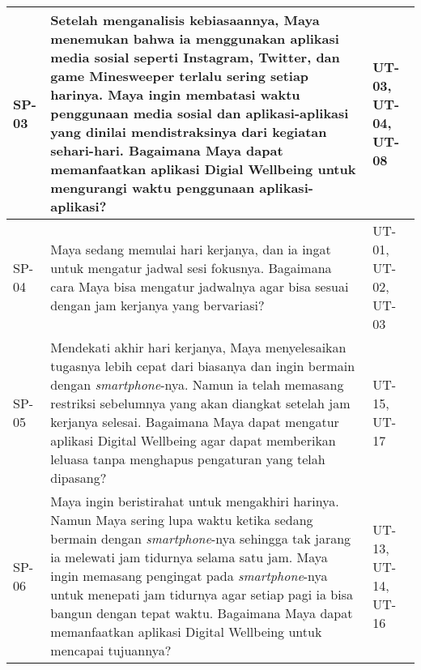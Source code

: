 \begin{footnotesize}
\begin{longtable}[c]{|W{c}{0.07\textwidth}|>{\ccnormspacing}m{0.6\textwidth}|>{\ccnormspacingcenter}m{0.24\textwidth}|}
  SP-03 & Setelah menganalisis kebiasaannya, Maya menemukan bahwa ia menggunakan aplikasi media sosial seperti Instagram, Twitter, dan game Minesweeper terlalu sering setiap harinya. Maya ingin membatasi waktu penggunaan media sosial dan aplikasi-aplikasi yang dinilai mendistraksinya dari kegiatan sehari-hari. Bagaimana Maya dapat memanfaatkan aplikasi Digial Wellbeing untuk mengurangi waktu penggunaan aplikasi-aplikasi? & UT-03, UT-04, UT-08 \\ \hline

  SP-04  & Maya sedang memulai hari kerjanya, dan ia ingat untuk mengatur jadwal sesi fokusnya. Bagaimana cara Maya bisa mengatur jadwalnya agar bisa sesuai dengan jam kerjanya yang bervariasi? & UT-01, UT-02, UT-03 \\ \hline
  
  SP-05  & Mendekati akhir hari kerjanya, Maya menyelesaikan tugasnya lebih cepat dari biasanya dan ingin bermain dengan \textit{smartphone}-nya. Namun ia telah memasang restriksi sebelumnya yang akan diangkat setelah jam kerjanya selesai. Bagaimana Maya dapat mengatur aplikasi Digital Wellbeing agar dapat memberikan leluasa tanpa menghapus pengaturan yang telah dipasang? & UT-15, UT-17 \\ \hline
  
  SP-06  & Maya ingin beristirahat untuk mengakhiri harinya. Namun Maya sering lupa waktu ketika sedang bermain dengan \textit{smartphone}-nya sehingga tak jarang ia melewati jam tidurnya selama satu jam. Maya ingin memasang pengingat pada \textit{smartphone}-nya untuk menepati jam tidurnya agar setiap pagi ia bisa bangun dengan tepat waktu. Bagaimana Maya dapat memanfaatkan aplikasi Digital Wellbeing untuk mencapai tujuannya? & UT-13, UT-14, UT-16 \\ \hline
\end{longtable}
\end{footnotesize}
\justifying
\FloatBarrier
